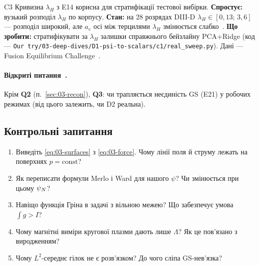 \begin{conjecture}{C3}
Кривизна $\lambda_H$ з E14 корисна для стратифікації тестової вибірки. \textbf{Спростує:} вузький розподіл $\lambda_H$ по корпусу. \textbf{Стан:} на 28 розрядах DIII-D $\lambda_H\in[0{,}13;\,3{,}6]$ --- розподіл широкий, але $a_e$ осі між терцилями $\lambda_H$ змінюється слабко~\cite{ProjRegisters}. \textbf{Що зробити:} стратифікувати за $\lambda_H$ залишки справжнього бейзлайну PCA+Ridge (код --- \texttt{Our try/03-deep-dives/D1-psi-to-scalars/c1/real\_sweep.py}). Дані --- Fusion Equilibrium Challenge~\cite{FEC2026}.
\end{conjecture}

\paragraph{Відкриті питання~\cite{ProjRegisters}.} Крім \textbf{Q2} (п.~\ref{sec:03-recon}), \textbf{Q3}: чи трапляється неєдиність GS (E21) у робочих режимах (від цього залежить, чи D2 реальна).

\subsection*{Контрольні запитання}
\begin{enumerate}
\item Виведіть \eqref{eq:03-surfaces} з \eqref{eq:03-force}. Чому лінії поля й струму лежать на поверхнях $p=\text{const}$?
\item Як переписати формули Merlo і Ward для нашого $\psi$? Чи змінюється при цьому $\psi_{N}$?
\item Навіщо функція Гріна в задачі з вільною межею? Що забезпечує умова $\int g>I$?
\item Чому магнітні виміри кругової плазми дають лише $\Lambda$? Як це пов'язано з виродженням?
\item Чому $L^2$-середнє гілок не є розв'язком? До чого сліпа GS-нев'язка?
\end{enumerate}

